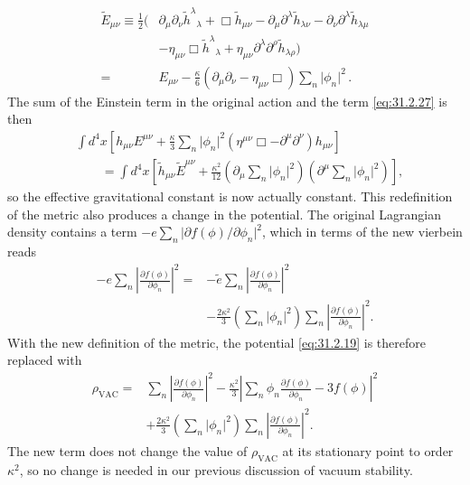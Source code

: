 \begin{equation}
  \begin{aligned}
  \widetilde E_{\mu\nu}\equiv\frac12\bigl(
    &\partial_\mu\partial_\nu\widetilde h^\lambda{}_\lambda
     +\Box\widetilde h_{\mu\nu}
     -\partial_\mu\partial^\lambda\widetilde h_{\lambda\nu}
     -\partial_\nu\partial^\lambda\widetilde h_{\lambda\mu}
  \\
    &-\eta_{\mu\nu}\Box\widetilde h^\lambda{}_\lambda
     +\eta_{\mu\nu}\partial^\lambda\partial^\rho
      \widetilde h_{\lambda\rho}
  \bigr)
  \\
  ={}&E_{\mu\nu}
      -\frac{\kappa}{6}
       \left(\partial_\mu\partial_\nu-\eta_{\mu\nu}\Box\right)
       \sum_n\lvert\phi_n\rvert^2\,.
  \end{aligned}
  \tag{31.2.32}\label{eq:31.2.32}
\end{equation}
The sum of the Einstein term in the original action and the term
\eqref{eq:31.2.27} is then
\begin{equation}
  \begin{aligned}
  &\int d^4x
   \left[
     h_{\mu\nu}E^{\mu\nu}
     +\frac{\kappa}{3}\sum_n\lvert\phi_n\rvert^2
      \left(\eta^{\mu\nu}\Box-\partial^\mu\partial^\nu\right)h_{\mu\nu}
   \right]
  \\
  &\qquad
  =\int d^4x
   \left[
     \widetilde h_{\mu\nu}\widetilde E^{\mu\nu}
     +\frac{\kappa^2}{12}
      \left(\partial_\mu\sum_n\lvert\phi_n\rvert^2\right)
      \left(\partial^\mu\sum_n\lvert\phi_n\rvert^2\right)
   \right],
  \end{aligned}
  \tag{31.2.33}\label{eq:31.2.33}
\end{equation}
so the effective gravitational constant is now actually constant. This
redefinition of the metric also produces a change in the potential. The
original Lagrangian density contains a term
\(-e\sum_n\lvert\partial f(\phi)/\partial\phi_n\rvert^2\), which in terms of
the new vierbein reads
\[
  \begin{aligned}
  -e\sum_n\left\lvert\frac{\partial f(\phi)}{\partial\phi_n}\right\rvert^2
  ={}&
  -\widetilde e
   \sum_n\left\lvert\frac{\partial f(\phi)}{\partial\phi_n}\right\rvert^2
  \\
  &-\frac{2\kappa^2}{3}
   \left(\sum_n\lvert\phi_n\rvert^2\right)
   \sum_n\left\lvert\frac{\partial f(\phi)}{\partial\phi_n}\right\rvert^2.
  \end{aligned}
\]
With the new definition of the metric, the potential \eqref{eq:31.2.19} is
therefore replaced with
\begin{equation}
  \begin{aligned}
  \rho_{\mathrm{VAC}}={}&
    \sum_n
    \left\lvert\frac{\partial f(\phi)}{\partial\phi_n}\right\rvert^2
    -\frac{\kappa^2}{3}
     \left\lvert
       \sum_n\phi_n\frac{\partial f(\phi)}{\partial\phi_n}
       -3f(\phi)
     \right\rvert^2
  \\
  &+\frac{2\kappa^2}{3}
    \left(\sum_n\lvert\phi_n\rvert^2\right)
    \sum_n
    \left\lvert\frac{\partial f(\phi)}{\partial\phi_n}\right\rvert^2.
  \end{aligned}
  \tag{31.2.34}\label{eq:31.2.34}
\end{equation}
The new term does not change the value of \(\rho_{\mathrm{VAC}}\) at its
stationary point to order \(\kappa^2\), so no change is needed in our previous
discussion of vacuum stability.

